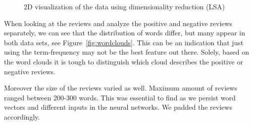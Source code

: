 \begin{figure}[ht!]
    \hfill
  \caption{2D visualization of the data using dimensionality reduction (LSA)}
  \label{fig:data-2d-vis} 
\end{figure}

When looking at the reviews and analyze the positive and negative reviews separately, we can see that the distribution of words differ, but many appear in both data sets, see Figure~\ref{fig:wordclouds}.
This can be an indication that just using the term-frequency may not be the best feature out there.
Solely, based on the word clouds it is tough to distinguish which cloud describes the positive or negative reviews.

Moreover the size of the reviews varied as well. Maximum amount of reviews ranged between 200-300 words. This was essential to find as we persist word vectors and different inputs in the neural networks. We padded the reviews accordingly.

